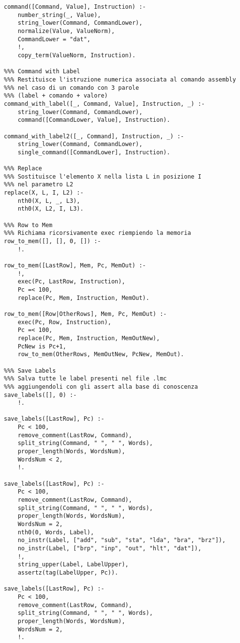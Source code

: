 \documentclass[a4paper,12pt, oneside]{book}
\begin{document}
\begin{verbatim}
command([Command, Value], Instruction) :- 
    number_string(_, Value),
    string_lower(Command, CommandLower), 
    normalize(Value, ValueNorm),           
    CommandLower = "dat",
    !,
    copy_term(ValueNorm, Instruction).

%%% Command with Label
%%% Restituisce l'istruzione numerica associata al comando assembly
%%% nel caso di un comando con 3 parole
%%% (label + comando + valore)
command_with_label([_, Command, Value], Instruction, _) :- 
    string_lower(Command, CommandLower),  
    command([CommandLower, Value], Instruction).

command_with_label2([_, Command], Instruction, _) :- 
    string_lower(Command, CommandLower),  
    single_command([CommandLower], Instruction).       

%%% Replace
%%% Sostituisce l'elemento X nella lista L in posizione I
%%% nel parametro L2
replace(X, L, I, L2) :- 
    nth0(X, L, _, L3), 
    nth0(X, L2, I, L3).

%%% Row to Mem
%%% Richiama ricorsivamente exec riempiendo la memoria
row_to_mem([], [], 0, []) :- 
    !.

row_to_mem([LastRow], Mem, Pc, MemOut) :- 
    !,
    exec(Pc, LastRow, Instruction),
    Pc =< 100,
    replace(Pc, Mem, Instruction, MemOut).

row_to_mem([Row|OtherRows], Mem, Pc, MemOut) :- 
    exec(Pc, Row, Instruction),
    Pc =< 100,
    replace(Pc, Mem, Instruction, MemOutNew),
    PcNew is Pc+1,
    row_to_mem(OtherRows, MemOutNew, PcNew, MemOut).

%%% Save Labels
%%% Salva tutte le label presenti nel file .lmc
%%% aggiungendoli con gli assert alla base di conoscenza 
save_labels([], 0) :- 
    !.

save_labels([LastRow], Pc) :- 
    Pc < 100,
    remove_comment(LastRow, Command),
    split_string(Command, " ", " ", Words),
    proper_length(Words, WordsNum),
    WordsNum < 2,
    !.

save_labels([LastRow], Pc) :- 
    Pc < 100,
    remove_comment(LastRow, Command),
    split_string(Command, " ", " ", Words),
    proper_length(Words, WordsNum),
    WordsNum = 2,
    nth0(0, Words, Label),
    no_instr(Label, ["add", "sub", "sta", "lda", "bra", "brz"]),
    no_instr(Label, ["brp", "inp", "out", "hlt", "dat"]),
    !, 
    string_upper(Label, LabelUpper),
    assertz(tag(LabelUpper, Pc)).

save_labels([LastRow], Pc) :- 
    Pc < 100,
    remove_comment(LastRow, Command),
    split_string(Command, " ", " ", Words),
    proper_length(Words, WordsNum),
    WordsNum = 2,
    !.


\end{verbatim}
\end{document}
